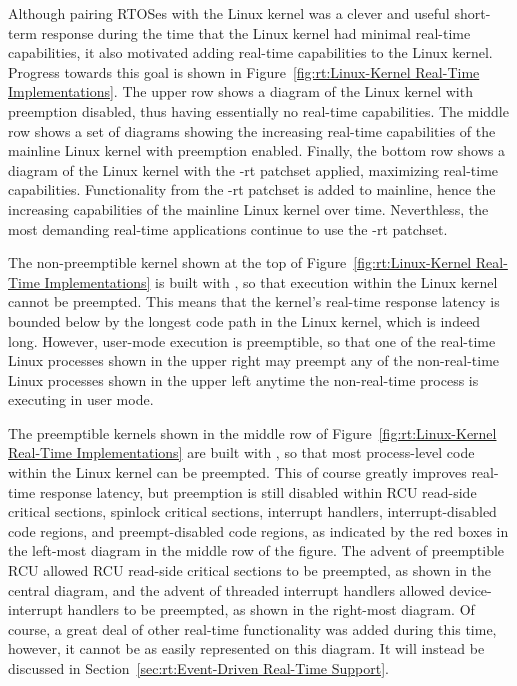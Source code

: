 Although pairing RTOSes with the Linux kernel was a clever and useful
short-term response during the time that the Linux kernel had minimal
real-time capabilities, it also motivated adding real-time capabilities
to the Linux kernel.
Progress towards this goal is shown in
Figure~\ref{fig:rt:Linux-Kernel Real-Time Implementations}.
The upper row shows a diagram of the Linux kernel with preemption disabled,
thus having essentially no real-time capabilities.
The middle row shows a set of diagrams showing the increasing real-time
capabilities of the mainline Linux kernel with preemption enabled.
Finally, the bottom row shows a diagram of the Linux kernel with the
-rt patchset applied, maximizing real-time capabilities.
Functionality from the -rt patchset is added to mainline,
hence the increasing capabilities of the mainline Linux kernel over time.
Neverthless, the most demanding real-time applications continue to use
the -rt patchset.

The non-preemptible kernel shown at the top of
Figure~\ref{fig:rt:Linux-Kernel Real-Time Implementations}
is built with , so that execution within the Linux
kernel cannot be preempted.
This means that the kernel's real-time response latency is bounded below
by the longest code path in the Linux kernel, which is indeed long.
However, user-mode execution is preemptible, so that one of the
real-time Linux processes shown in the upper right may preempt any of the
non-real-time Linux processes shown in the upper left anytime the
non-real-time process is executing in user mode.

The preemptible kernels shown in the middle row of
Figure~\ref{fig:rt:Linux-Kernel Real-Time Implementations}
are built with , so that most process-level code
within the Linux kernel can be preempted.
This of course greatly improves real-time response latency, but
preemption is still disabled
within RCU read-side critical sections,
spinlock critical sections,
interrupt handlers,
interrupt-disabled code regions, and
preempt-disabled code regions, as indicated by the red boxes in the
left-most diagram in the middle row of the figure.
The advent of preemptible RCU allowed RCU read-side critical sections
to be preempted, as shown in the central diagram,
and the advent of threaded interrupt handlers allowed device-interrupt
handlers to be preempted, as shown in the right-most diagram.
Of course, a great deal of other real-time functionality was added
during this time, however, it cannot be as easily represented on this
diagram.
It will instead be discussed in
Section~\ref{sec:rt:Event-Driven Real-Time Support}.


